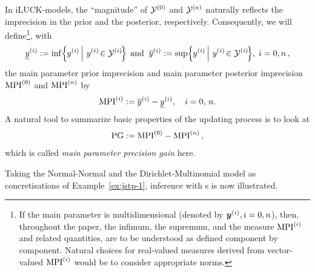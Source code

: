 \begin{remark}\label{071221-remark}
In iLUCK-models, the ``magnitude'' of $\mathcal{Y}^{(0)}$ and $\mathcal{Y}^{(n)}$ naturally reflects
the imprecision in the prior and the posterior, respectively.
Consequently, we will define\footnote{If the main parameter is
multidimensional (denoted by ${\bm y}^{(i)}, i=0,n$), then, throughout the paper, the infimum, the
supremum, and the measure ${\rm MPI}^{(i)}$ and related quantities,
are to be understood as defined component by component. Natural
choices for real-valued measures derived from vector-valued ${\rm MPI}^{(i)}$
would be to consider appropriate norms.}, with%
\begin{equation}\label{071214-3}
\yil := \inf\!\left\{\left.\! \yi\,\right|\, \yi\!\in \YI \!\right\}\;%
\text{and}\;\;
\yiu := \sup\!\left\{\left.\! \yi\,\right|\, \yi\!\in \YI \!\right\}\!, \; i=0,n\,,%
\end{equation}
the main parameter prior imprecision and main parameter
posterior imprecision ${\rm MPI}^{(0)}$ and ${\rm MPI}^{(n)}$ by%
\begin{equation}\label{071214-4}
{\rm MPI}\ui := \yiu - \yil,\quad i=0,\,n.%
\end{equation}
A natural tool to summarize basic properties of the updating process is to look at%
\begin{equation}
{\rm PG}:= {\rm MPI}\uz - {\rm MPI}\un \,,%
\end{equation}%
which is called \emph{main parameter precision gain} here.
\end{remark}
Taking the Normal-Normal and the Dirichlet-Multinomial model as concretisations
of Example~\ref{ex:jstp-1}, inference with \ymodel s is now illustrated.

